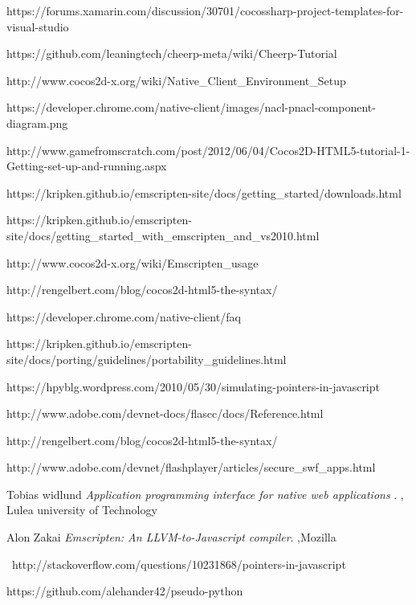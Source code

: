 \documentclass[23pt]{article}
\begin{document}
\begin{thebibliography}{9}
{https://forums.xamarin.com/discussion/30701/cocossharp-project-templates-for-visual-studio}

{https://github.com/leaningtech/cheerp-meta/wiki/Cheerp-Tutorial}

{http://www.cocos2d-x.org/wiki/Native\_Client\_Environment\_Setup}


{https://developer.chrome.com/native-client/images/nacl-pnacl-component-diagram.png}

{http://www.gamefromscratch.com/post/2012/06/04/Cocos2D-HTML5-tutorial-1-Getting-set-up-and-running.aspx}

{https://kripken.github.io/emscripten-site/docs/getting\_started/downloads.html}

{https://kripken.github.io/emscripten-site/docs/getting\_started\_with\_emscripten\_and\_vs2010.html}

{http://www.cocos2d-x.org/wiki/Emscripten\_usage}

{http://rengelbert.com/blog/cocos2d-html5-the-syntax/}

{https://developer.chrome.com/native-client/faq}

{https://kripken.github.io/emscripten-site/docs/porting/guidelines/portability\_guidelines.html}

{https://hpyblg.wordpress.com/2010/05/30/simulating-pointers-in-javascript}

{http://www.adobe.com/devnet-docs/flascc/docs/Reference.html} 

{http://rengelbert.com/blog/cocos2d-html5-the-syntax/}

{http://www.adobe.com/devnet/flashplayer/articles/secure\_swf\_apps.html}

Tobias widlund
\textit{Application programming interface for native web applications }. 
, Lulea university of Technology
 
Alon Zakai 
\textit{Emscripten: An LLVM-to-Javascript compiler}. 
 ,Mozilla

\  http://stackoverflow.com/questions/10231868/pointers-in-javascript

{https://github.com/alehander42/pseudo-python}


\end{thebibliography}
\end{document}
